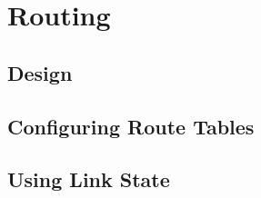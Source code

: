 \chapter{Routing}

\section{Design}
 \label{routing:design}

\section{Configuring Route Tables}

\section{Using Link State}

